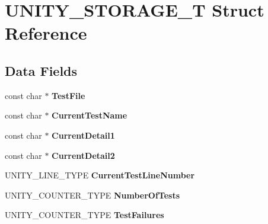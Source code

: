 \hypertarget{struct_u_n_i_t_y___s_t_o_r_a_g_e___t}{}\section{U\+N\+I\+T\+Y\+\_\+\+S\+T\+O\+R\+A\+G\+E\+\_\+T Struct Reference}
\label{struct_u_n_i_t_y___s_t_o_r_a_g_e___t}
\subsection*{Data Fields}
\begin{DoxyCompactItemize}
\item 
\mbox{\label{struct_u_n_i_t_y___s_t_o_r_a_g_e___t_a190c9e7550689c6dceedff539e650336}} 
const char $\ast$ {\bfseries Test\+File}
\item 
\mbox{\label{struct_u_n_i_t_y___s_t_o_r_a_g_e___t_a6779e1e7dc5d26835d5ca7009242e77c}} 
const char $\ast$ {\bfseries Current\+Test\+Name}
\item 
\mbox{\label{struct_u_n_i_t_y___s_t_o_r_a_g_e___t_a83cef77fb47897cfe6c4dba18d9f36c0}} 
const char $\ast$ {\bfseries Current\+Detail1}
\item 
\mbox{\label{struct_u_n_i_t_y___s_t_o_r_a_g_e___t_a46f31dad8da75fe0c1ece891fbb3208b}} 
const char $\ast$ {\bfseries Current\+Detail2}
\item 
\mbox{\label{struct_u_n_i_t_y___s_t_o_r_a_g_e___t_af263a120c12a489e9310ef9f36444128}} 
U\+N\+I\+T\+Y\+\_\+\+L\+I\+N\+E\+\_\+\+T\+Y\+PE {\bfseries Current\+Test\+Line\+Number}
\item 
\mbox{\label{struct_u_n_i_t_y___s_t_o_r_a_g_e___t_a82127e77cd34e1a1c2b0281e3597d5ba}} 
U\+N\+I\+T\+Y\+\_\+\+C\+O\+U\+N\+T\+E\+R\+\_\+\+T\+Y\+PE {\bfseries Number\+Of\+Tests}
\item 
\mbox{\label{struct_u_n_i_t_y___s_t_o_r_a_g_e___t_a09833b8f72da6d7982f37ebc33111252}} 
U\+N\+I\+T\+Y\+\_\+\+C\+O\+U\+N\+T\+E\+R\+\_\+\+T\+Y\+PE {\bfseries Test\+Failures}

\end{DoxyCompactItemize}
